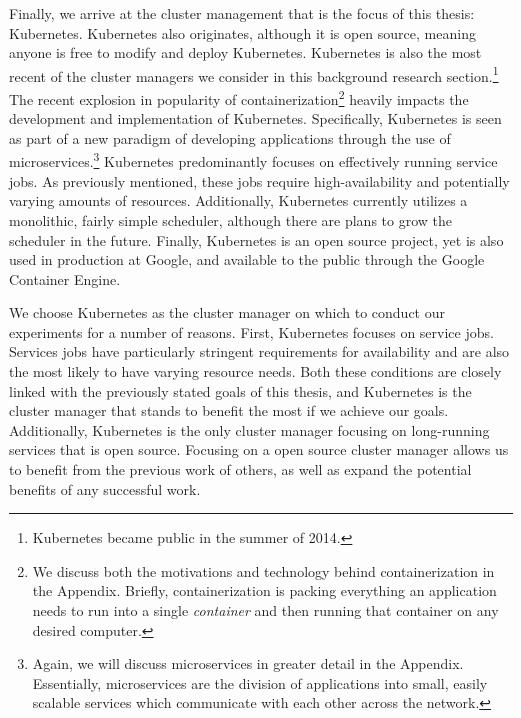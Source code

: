 Finally, we arrive at the cluster management that is the focus of this thesis:
Kubernetes. Kubernetes also originates, although it is open source, meaning
anyone is free to modify and deploy Kubernetes. Kubernetes is also the most
recent of the cluster managers we consider in this background research
section.\footnote{Kubernetes became public in the summer of 2014.} The recent
explosion in popularity of containerization\footnote{We discuss both the motivations and
technology behind containerization in the Appendix. Briefly, containerization is
packing everything an application needs to run into a single \textit{container}
and then running that container on any desired computer.}
heavily impacts the development and implementation of Kubernetes. Specifically,
Kubernetes is seen as part of a new paradigm of developing applications
through the use of microservices.\footnote{Again, we will
discuss microservices in greater detail
in the Appendix. Essentially, microservices are the division of applications
into small, easily scalable services which communicate with each other across
the network.} Kubernetes predominantly focuses on effectively running service
jobs. As previously mentioned, these jobs require
high-availability and potentially varying amounts of resources. Additionally,
Kubernetes currently utilizes a monolithic, fairly simple scheduler, although
there are plans to grow the scheduler in the future.\cite{k8s-design-overview}
Finally, Kubernetes is an open source project, yet is also used in production at
Google, and available to the public through the Google Container
Engine.\cite{google-container-engine}

We choose Kubernetes as the cluster manager on which to conduct our experiments
for a number of reasons. First, Kubernetes focuses on service jobs. Services jobs
have particularly stringent requirements for availability and are also the most
likely to have varying resource needs. Both these conditions are closely linked
with the previously stated goals of this thesis, and Kubernetes is the cluster
manager that stands to benefit the most if we achieve our goals. Additionally,
Kubernetes is the only cluster manager focusing on long-running services that is
open source. Focusing on a open source cluster manager allows us to benefit from
the previous work of others, as well as expand the potential benefits of any
successful work.
